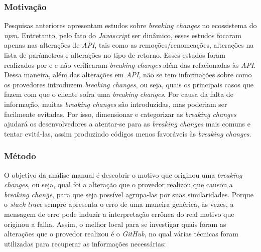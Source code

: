 \subsubsection{Motivação}
\label{sec:qp2:motivation}
Pesquisas anteriores apresentam estudos sobre \textit{breaking changes} no ecossistema do \textit{npm}. Entretanto, pelo fato do \textit{Javascript} ser dinâmico, esses estudos focaram apenas nas alterações de \textit{API}, tais como as remoções/renomeações, alterações na lista de parâmetros e alterações no tipo de retorno. Esses estudos foram realizados por   e  e não verificaram \textit{breaking changes} além das relacionadas às \textit{API}. Dessa maneira, além das alterações em \textit{API}, não se tem informações sobre como os provedores introduzem \textit{breaking changes}, ou seja, quais os principais casos que fazem com que o cliente sofra uma \textit{breaking changes}. Por causa da falta de informação, muitas \textit{breaking changes} são introduzidas, mas poderiam ser facilmente evitadas. Por isso, dimensionar e categorizar as \textit{breaking changes} ajudará os desenvolvedores a atentar-se para as \textit{breaking changes} mais comuns e tentar evitá-las, assim produzindo códigos menos favoráveis às \textit{breaking changes}.

\subsubsection{Método}
\label{sec:qp2:approach}
O objetivo da análise manual é descobrir o motivo que originou uma \textit{breaking changes}, ou seja, qual foi a alteração que o provedor realizou que causou a \textit{breaking change}, para que seja possível agrupa-las por suas similaridades. Porque o \textit{stack trace} sempre apresenta o erro de uma maneira genérica, às vezes, a mensagem de erro pode induzir a interpretação errônea do real motivo que originou a falha. Assim, o melhor local para se investigar quais foram as alterações que o provedor realizou é o \textit{GitHub}, no qual várias técnicas foram utilizadas para recuperar as informações necessárias:

